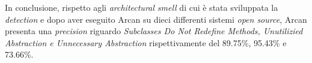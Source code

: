 In conclusione, rispetto agli \textit{architectural smell} di cui è stata sviluppata la \textit{detection} e dopo aver eseguito Arcan su dieci differenti sistemi \textit{open source}, Arcan presenta una \textit{precision} riguardo \textit{Subclasses Do Not Redefine Methods, Unutilizied Abstraction e Unnecessary Abstraction} rispettivamente del 89.75\%, 95.43\% e 73.66\%.